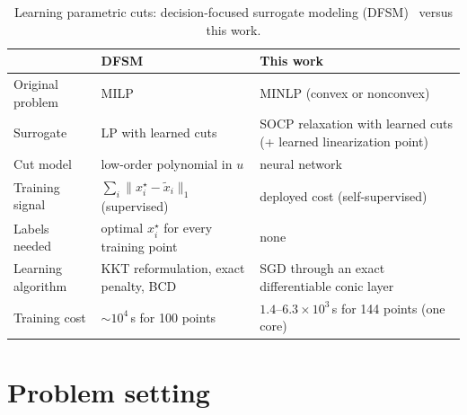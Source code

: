 \documentclass[10pt]{article}
\begin{document}
\begin{table}[t]
\centering\small
\caption{Learning parametric cuts: decision-focused surrogate modeling (DFSM)~\citep{dixit2025dfsm} versus this work.}
\label{tab:dfsm}
\begin{tabular}{@{}lll@{}}
\toprule
 & DFSM~\citep{dixit2025dfsm} & This work \\
\midrule
Original problem & MILP & MINLP (convex or nonconvex) \\
Surrogate & LP with learned cuts & SOCP relaxation with learned cuts (+ learned linearization point) \\
Cut model & low-order polynomial in $u$ & neural network \\
Training signal & $\sum_i\|x_i^\star-\tilde x_i\|_1$ (supervised) & deployed cost (self-supervised) \\
Labels needed & optimal $x_i^\star$ for every training point & none \\
Learning algorithm & KKT reformulation, exact penalty, BCD & SGD through an exact differentiable conic layer \\
Training cost & $\sim\!10^4$\,s for 100 points & $1.4$--$6.3\times10^3$\,s for 144 points (one core) \\
\bottomrule
\end{tabular}
\end{table}

\section{Problem setting}
\label{sec:setting}
\end{document}
